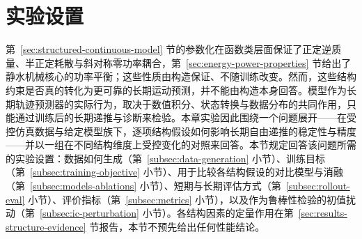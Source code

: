 
\section{实验设置}
\label{sec:training-baselines-protocol}

第~\ref{sec:structured-continuous-model} 节的参数化在函数类层面保证了正定逆质量、半正定耗散与斜对称零功率耦合，第~\ref{sec:energy-power-properties} 节给出了静水机械核心的功率平衡；这些性质由构造保证、不随训练改变。然而，这些结构约束是否真的转化为更可靠的长期运动预测，并不能由构造本身回答。模型作为长期轨迹预测器的实际行为，取决于数值积分、状态转换与数据分布的共同作用，只能通过训练后的长期递推与诊断来检验。本章实验因此围绕一个问题展开——在受控仿真数据与给定模型族下，逐项结构假设如何影响长期自由递推的稳定性与精度——并以一组在不同结构维度上受控变化的对照来回答。本节规定回答该问题所需的实验设置：数据如何生成（第~\ref{subsec:data-generation} 小节）、训练目标（第~\ref{subsec:training-objective} 小节）、用于比较各结构假设的对比模型与消融（第~\ref{subsec:models-ablations} 小节）、短期与长期评估方式（第~\ref{subsec:rollout-eval} 小节）、评价指标（第~\ref{subsec:metrics} 小节），以及作为鲁棒性检验的初值扰动（第~\ref{subsec:ic-perturbation} 小节）。各结构因素的定量作用在第~\ref{sec:results-structure-evidence} 节报告，本节不预先给出任何性能结论。

